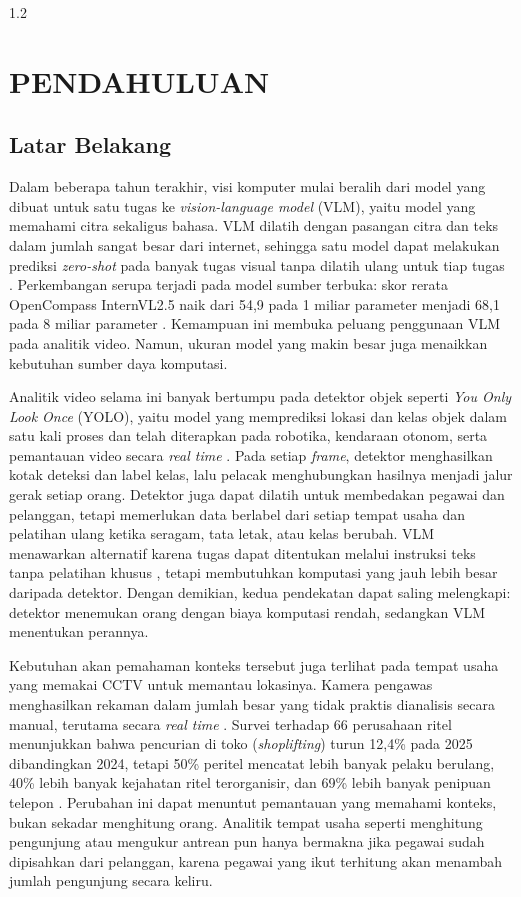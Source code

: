 \begin{spacing}{1.2}
  \chapter{PENDAHULUAN}
\end{spacing}


\vspace{4ex}
\section{Latar Belakang} 
Dalam beberapa tahun terakhir, visi komputer mulai beralih dari model yang dibuat untuk satu tugas ke \textit{vision-language model} (VLM), yaitu model yang memahami citra sekaligus bahasa. VLM dilatih dengan pasangan citra dan teks dalam jumlah sangat besar dari internet, sehingga satu model dapat melakukan prediksi \textit{zero-shot} pada banyak tugas visual tanpa dilatih ulang untuk tiap tugas \cite{ref6}. Perkembangan serupa terjadi pada model sumber terbuka: skor rerata OpenCompass InternVL2.5 naik dari 54,9 pada 1 miliar parameter menjadi 68,1 pada 8 miliar parameter \cite{ref29}. Kemampuan ini membuka peluang penggunaan VLM pada analitik video. Namun, ukuran model yang makin besar juga menaikkan kebutuhan sumber daya komputasi.

Analitik video selama ini banyak bertumpu pada detektor objek seperti \textit{You Only Look Once} (YOLO), yaitu model yang memprediksi lokasi dan kelas objek dalam satu kali proses dan telah diterapkan pada robotika, kendaraan otonom, serta pemantauan video secara \textit{real time} \cite{ref2}. Pada setiap \textit{frame}, detektor menghasilkan kotak deteksi dan label kelas, lalu pelacak menghubungkan hasilnya menjadi jalur gerak setiap orang. Detektor juga dapat dilatih untuk membedakan pegawai dan pelanggan, tetapi memerlukan data berlabel dari setiap tempat usaha dan pelatihan ulang ketika seragam, tata letak, atau kelas berubah. VLM menawarkan alternatif karena tugas dapat ditentukan melalui instruksi teks tanpa pelatihan khusus \cite{ref6}, tetapi membutuhkan komputasi yang jauh lebih besar daripada detektor. Dengan demikian, kedua pendekatan dapat saling melengkapi: detektor menemukan orang dengan biaya komputasi rendah, sedangkan VLM menentukan perannya.

Kebutuhan akan pemahaman konteks tersebut juga terlihat pada tempat usaha yang memakai CCTV untuk memantau lokasinya. Kamera pengawas menghasilkan rekaman dalam jumlah besar yang tidak praktis dianalisis secara manual, terutama secara \textit{real time} \cite{ref28}. Survei terhadap 66 perusahaan ritel menunjukkan bahwa pencurian di toko (\textit{shoplifting}) turun 12,4\% pada 2025 dibandingkan 2024, tetapi 50\% peritel mencatat lebih banyak pelaku berulang, 40\% lebih banyak kejahatan ritel terorganisir, dan 69\% lebih banyak penipuan telepon \cite{ref38}. Perubahan ini dapat menuntut pemantauan yang memahami konteks, bukan sekadar menghitung orang. Analitik tempat usaha seperti menghitung pengunjung atau mengukur antrean pun hanya bermakna jika pegawai sudah dipisahkan dari pelanggan, karena pegawai yang ikut terhitung akan menambah jumlah pengunjung secara keliru.

